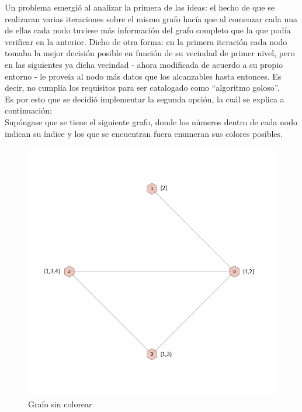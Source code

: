 Un problema emergió al analizar la primera de las ideas: el hecho de que se realizaran varias iteraciones sobre el mismo grafo hacía que al comenzar cada una de ellas cada nodo tuviese más información del grafo completo que la que podía verificar en la anterior. Dicho de otra forma: en la primera iteración cada nodo tomaba la mejor decisión posible en función de su vecindad de primer nivel, pero en las siguientes ya dicha vecindad - ahora modificada de acuerdo a su propio entorno - le proveía al nodo más datos que los alcanzables hasta entonces. Es decir, no cumplía los requisitos para ser catalogado como ``algoritmo goloso''.\\
Es por esto que se decidió implementar la segunda opción, la cuál se explica a continuación:\\
Supóngase que se tiene el siguiente grafo, donde los números dentro de cada nodo indican su índice y los que se encuentran fuera enumeran sus colores posibles.\\

 \begin{figure}[H]
    \begin{center}
  	\includegraphics[width=13cm]{imagenes/ej3/4Nodos0.png}
 	\caption{Grafo sin colorear}
 	\label{sinColor}
    \end{center}
  \end{figure}



